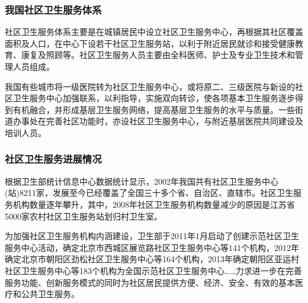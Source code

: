 \subsubsection{我国社区卫生服务体系}
社区卫生服务体系主要是在城镇居民中设立社区卫生服务中心，再根据其社区覆盖面积及人口，在中心下设若干社区卫生服务站，以利于附近居民就诊和接受健康教育、康复及照顾等。社区卫生服务人员主要由全科医师、护士及专业卫生技术和管理人员组成。

我国有些城市将一级医院转为社区卫生服务中心，或将原二、三级医院与新设的社区卫生服务中心加强联系，以利指导，实施双向转诊，使各项基本卫生服务逐步得到有机融合，并形成基层卫生服务网络，提高基层卫生服务的水平与质量。一些街道办事处在完善社区功能时，亦设社区卫生服务中心，与附近基层医院共同建设及培训人员。

\subsubsection{社区卫生服务进展情况}
根据卫生部统计信息中心数据统计显示，2002年我国共有社区卫生服务中心(站)8211家，发展至今已经覆盖了全国三十多个省、自治区、直辖市。社区卫生服务机构数量逐年攀升，其中，2008年社区卫生服务机构数量减少的原因是江苏省5000家农村社区卫生服务站划归村卫生室。

为加强社区卫生服务机构内涵建设，卫生部于2011年1月启动了创建示范社区卫生服务中心活动，确定北京市西城区展览路社区卫生服务中心等141个机构，2012年确定北京市朝阳区劲松社区卫生服务中心等164个机构，2013年确定朝阳区亚运村社区卫生服务中心等183个机构为全国示范社区卫生服务中心……力求进一步在完善服务功能、创新服务模式的同时为社区居民提供方便、经济、安全、有效的基本医疗和公共卫生服务。


